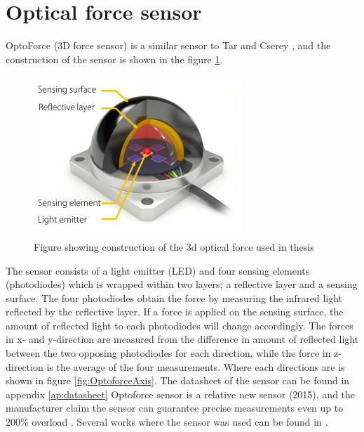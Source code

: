 \documentclass[USenglish]{ifimaster}  %
\begin{document}
\section{Optical force sensor}
OptoForce (3D force sensor) \cite{Optoforce} is a similar sensor to Tar and Cserey \cite{6027100}, and the construction of the sensor is shown in the figure \ref{fig:OptoforceBuild}. 
\begin{figure}[h]
	\centering
	\includegraphics[scale=0.8]{Figures/OptoforceBuild}
	\caption{Figure showing construction of the 3d optical force used in thesis \cite{OptoforceFig}}
	\label{fig:OptoforceBuild}
\end{figure}
\FloatBarrier

The sensor consists of a light emitter (LED) and four sensing elements (photodiodes) which is wrapped within two layers; a reflective layer and a sensing surface. The four photodiodes obtain the force by measuring the infrared light reflected by the reflective layer. If a force is applied on the sensing surface, the amount of reflected light to each photodiodes will change accordingly. The forces in x- and y-direction are measured from the difference in amount of reflected light between the two opposing photodiodes for each direction, while the force in z-direction is the average of the four measurements. Where each directions are is shown in figure \ref{fig:OptoforceAxis}. The datasheet of the sensor can be found in appendix \ref{ap:datasheet} Optoforce sensor is a relative new sensor (2015), and the manufacturer claim the sensor can guarantee precise measurements even up to 200\% overload \cite{Optoforce2}. Several works where the sensor was used can be found in \cite{7803326,7759112,7849467}.
\end{document}
